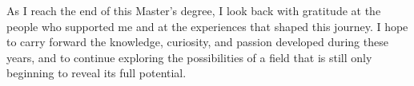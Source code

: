 \vspace{0.35cm}

\noindent As I reach the end of this Master's degree, I look back with gratitude at the people who supported me and at the experiences that shaped this journey. I hope to carry forward the knowledge, curiosity, and passion developed during these years, and to continue exploring the possibilities of a field that is still only beginning to reveal its full potential.

\vspace{0.75cm}

\noindent{\myLocation, \myTime}
\hfill \textit{\myName}

\endgroup
